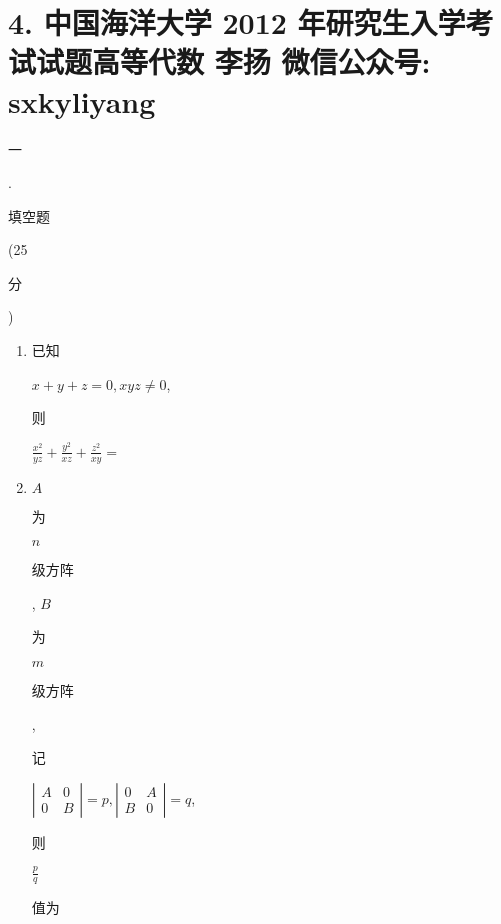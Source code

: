 \documentclass[10pt]{article}
\begin{document}
\section{4. 中国海洋大学 2012 年研究生入学考试试题高等代数 
 李扬 
 微信公众号: sxkyliyang}
\begin{CJK}{UTF8}{mj}一\end{CJK}. \begin{CJK}{UTF8}{mj}填空题\end{CJK} (25 \begin{CJK}{UTF8}{mj}分\end{CJK})

\begin{enumerate}
  \item \begin{CJK}{UTF8}{mj}已知\end{CJK} $x+y+z=0, x y z \neq 0$, \begin{CJK}{UTF8}{mj}则\end{CJK} $\frac{x^{2}}{y z}+\frac{y^{2}}{x z}+\frac{z^{2}}{x y}=$

  \item $A$ \begin{CJK}{UTF8}{mj}为\end{CJK} $n$ \begin{CJK}{UTF8}{mj}级方阵\end{CJK}, $B$ \begin{CJK}{UTF8}{mj}为\end{CJK} $m$ \begin{CJK}{UTF8}{mj}级方阵\end{CJK}, \begin{CJK}{UTF8}{mj}记\end{CJK} $\left|\begin{array}{cc}A & 0 \\ 0 & B\end{array}\right|=p,\left|\begin{array}{cc}0 & A \\ B & 0\end{array}\right|=q$, \begin{CJK}{UTF8}{mj}则\end{CJK} $\frac{p}{q}$ \begin{CJK}{UTF8}{mj}值为\end{CJK}


\end{enumerate}
\end{document}
